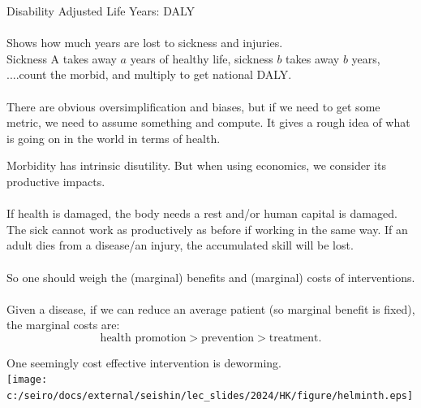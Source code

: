 \begin{frame}{}
Disability Adjusted Life Years: DALY\\~\\

Shows how much years are lost to sickness and injuries.\\

Sickness A takes away $a$ years of healthy life, sickness $b$ takes away $b$ years, ....count the morbid, and multiply to get national DALY.\\~\\

There are obvious oversimplification and biases, but if we need to get some metric, we need to assume something and compute. It gives a rough idea of what is going on in the world in terms of health.
\end{frame}

\begin{frame}{}
Morbidity has intrinsic disutility. But when using economics, we consider its productive impacts.\\~\\

If health is damaged, the body needs a rest and/or human capital is damaged. The sick cannot work as productively as before if working in the same way. If an adult dies from a disease/an injury, the accumulated skill will be lost. \\~\\

So one should weigh the (marginal) benefits and (marginal) costs of interventions.\\~\\

Given a disease, if we can reduce an average patient (so marginal benefit is fixed), the marginal costs are:
\[
\mbox{health promotion} > \mbox{prevention} > \mbox{treatment}.
\]
\end{frame}

\begin{frame}{}
One seemingly cost effective intervention is deworming.\\
\pause
\hfil\texttt{[image: c:/seiro/docs/external/seishin/lec\_slides/2024/HK/figure/helminth.eps]}
\end{frame}

